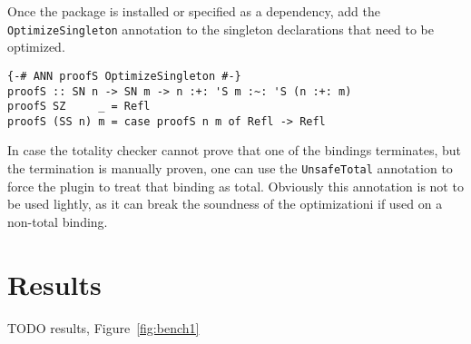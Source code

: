 Once the package is installed or specified as a dependency, add the \texttt{OptimizeSingleton} annotation to the singleton declarations that need to be optimized.

\begin{lstlisting}[caption=Optimizing \texttt{proofS}]
{-# ANN proofS OptimizeSingleton #-}
proofS :: SN n -> SN m -> n :+: 'S m :~: 'S (n :+: m)
proofS SZ     _ = Refl
proofS (SS n) m = case proofS n m of Refl -> Refl
\end{lstlisting}

In case the totality checker cannot prove that one of the bindings terminates, but the termination is manually proven, one can use the \texttt{UnsafeTotal} annotation to force the plugin to treat that binding as total.
Obviously this annotation is not to be used lightly, as it can break the soundness of the optimizationi if used on a non-total binding.

\chapter{Results}
\label{cha:results}

TODO results, Figure~\ref{fig:bench1}

